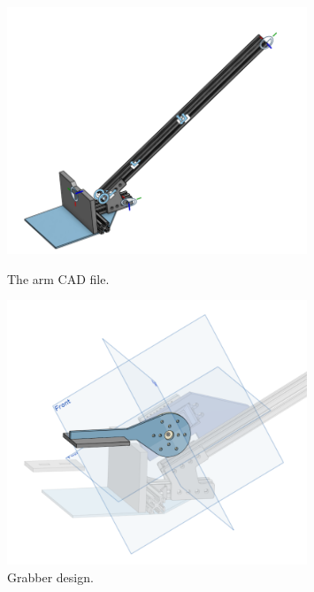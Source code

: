 \begin{figure}[ht]
\centering
\begin{minipage}[b]{.50\textwidth}
  \centering
  \includegraphics[width=0.8\textwidth]{Meetings/October/10-11-21/10-11-21_Hardware_Figure3 - Nathan Forrer.PNG}
  \caption{The arm CAD file.}
  \label{fig:pic3}
\end{minipage}%
\hfill%
\begin{minipage}[b]{.50\textwidth}
  \centering
  \includegraphics[width=0.8\textwidth]{Meetings/October/10-11-21/10-11-21_Hardware_Figure4 - Nathan Forrer.PNG}
  \caption{Grabber design.}
  \label{fig:pic4}
\end{minipage}
\end{figure}


